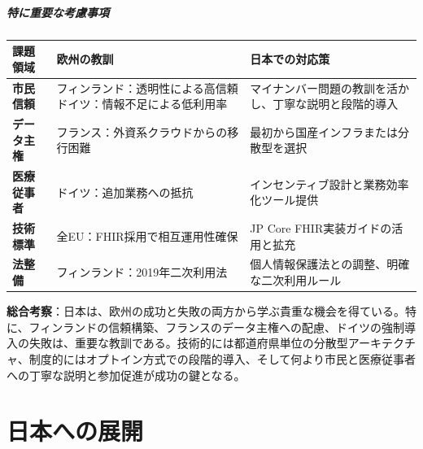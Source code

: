 \documentclass[
  a4paper,
  a4paper,
  11pt]{ltjsbook}
\begin{document}
\subsubsection{特に重要な考慮事項}\label{ux7279ux306bux91cdux8981ux306aux8003ux616eux4e8bux9805}

\begin{longtable}[]{@{}
  >{\raggedright\arraybackslash}p{}
  >{\raggedright\arraybackslash}p{}
  >{\raggedright\arraybackslash}p{}@{}}
\toprule\noalign{}
\begin{minipage}[b]{\linewidth}\raggedright
課題領域
\end{minipage} & \begin{minipage}[b]{\linewidth}\raggedright
欧州の教訓
\end{minipage} & \begin{minipage}[b]{\linewidth}\raggedright
日本での対応策
\end{minipage} \\
\midrule\noalign{}
\endhead
\bottomrule\noalign{}
\endlastfoot
\textbf{市民信頼} &
フィンランド：透明性による高信頼ドイツ：情報不足による低利用率 &
マイナンバー問題の教訓を活かし、丁寧な説明と段階的導入 \\
\textbf{データ主権} & フランス：外資系クラウドからの移行困難 &
最初から国産インフラまたは分散型を選択 \\
\textbf{医療従事者} & ドイツ：追加業務への抵抗 &
インセンティブ設計と業務効率化ツール提供 \\
\textbf{技術標準} & 全EU：FHIR採用で相互運用性確保 & JP Core
FHIR実装ガイドの活用と拡充 \\
\textbf{法整備} & フィンランド：2019年二次利用法 &
個人情報保護法との調整、明確な二次利用ルール \\
\end{longtable}

\textbf{総合考察}：日本は、欧州の成功と失敗の両方から学ぶ貴重な機会を得ている。特に、フィンランドの信頼構築、フランスのデータ主権への配慮、ドイツの強制導入の失敗は、重要な教訓である。技術的には都道府県単位の分散型アーキテクチャ、制度的にはオプトイン方式での段階的導入、そして何より市民と医療従事者への丁寧な説明と参加促進が成功の鍵となる。

\part{日本への展開}
\end{document}
